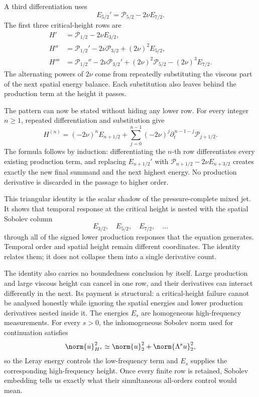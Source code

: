 A third differentiation uses
\[
  E_{5/2}'
  =
  \mathcal P_{5/2}-2\nu E_{7/2}.
\]
The first three critical-height rows are
\begin{align*}
  H'
  &={}
  \mathcal P_{1/2}-2\nu E_{3/2},
  \\
  H''
  &={}
  \mathcal P_{1/2}'
  -2\nu\mathcal P_{3/2}
  +(2\nu)^2E_{5/2},
  \\
  H'''
  &={}
  \mathcal P_{1/2}''
  -2\nu\mathcal P_{3/2}'
  +(2\nu)^2\mathcal P_{5/2}
  -(2\nu)^3E_{7/2}.
\end{align*}
The alternating powers of \(2\nu\) come from repeatedly substituting the viscous part of the next spatial energy balance.
Each substitution also leaves behind the production term at the height it passes.

The pattern can now be stated without hiding any lower row.
For every integer \(n\geq1\), repeated differentiation and substitution give
\[
  H^{(n)}
  =
  (-2\nu)^nE_{n+1/2}
  +
  \sum_{j=0}^{n-1}
  (-2\nu)^j
  \partial_t^{\,n-1-j}\mathcal P_{j+1/2}.
\]
The formula follows by induction: differentiating the \(n\)-th row differentiates every existing production term, and replacing \(E_{n+1/2}'\) with \(\mathcal P_{n+1/2}-2\nu E_{n+3/2}\) creates exactly the new final summand and the next highest energy.
No production derivative is discarded in the passage to higher order.

This triangular identity is the scalar shadow of the pressure-complete mixed jet.
It shows that temporal response at the critical height is nested with the spatial Sobolev column
\[
  E_{3/2},
  \quad
  E_{5/2},
  \quad
  E_{7/2},
  \quad\ldots
\]
through all of the signed lower production responses that the equation generates.
Temporal order and spatial height remain different coordinates.
The identity relates them; it does not collapse them into a single derivative count.

The identity also carries no boundedness conclusion by itself.
Large production and large viscous height can cancel in one row, and their derivatives can interact differently in the next.
Its payment is structural: a critical-height failure cannot be analysed honestly while ignoring the spatial energies and lower production derivatives nested inside it.
The energies \(E_s\) are homogeneous high-frequency measurements.
For every \(s>0\), the inhomogeneous Sobolev norm used for continuation satisfies
\[
  \norm{u}_{H^s}^2
  \simeq
  \norm{u}_2^2
  +
  \norm{\Lambda^su}_2^2,
\]
so the Leray energy controls the low-frequency term and \(E_s\) supplies the corresponding high-frequency height.
Once every finite row is retained, Sobolev embedding tells us exactly what their simultaneous all-orders control would mean.
